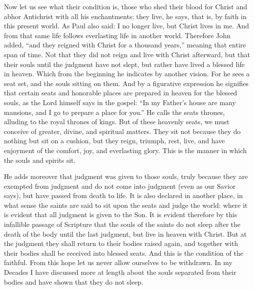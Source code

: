 Now let us see what their condition is, those who shed their blood for Christ and abhor Antichrist with all his enchantments: they live, he says, that is, by faith in this present world. As Paul also said: I no longer live, but Christ lives in me. And from that same life follows everlasting life in another world. Therefore John added, “and they reigned with Christ for a thousand years,” meaning that entire span of time. Not that they did not reign and live with Christ afterward, but that their souls until the judgment have not slept, but rather have lived a blessed life in heaven. Which from the beginning he indicates by another vision. For he sees a seat set, and the souls sitting on them. And by a figurative expression he signifies that certain seats and honorable places are prepared in heaven for the blessed souls, as the Lord himself says in the gospel: “In my Father’s house are many mansions, and I go to prepare a place for you.” He calls the seats thrones, alluding to the royal thrones of kings. But of these heavenly seats, we must conceive of greater, divine, and spiritual matters. They sit not because they do nothing but sit on a cushion, but they reign, triumph, rest, live, and have enjoyment of the comfort, joy, and everlasting glory. This is the manner in which the souls and spirits sit.

He adds moreover that judgment was given to those souls, truly because they are exempted from judgment and do not come into judgment (even as our Savior says), but have passed from death to life. It is also declared in another place, in what sense the saints are said to sit upon the seats and judge the world: where it is evident that all judgment is given to the Son. It is evident therefore by this infallible passage of Scripture that the souls of the saints do not sleep after the death of the body until the last judgment, but live in heaven with Christ. But at the judgment they shall return to their bodies raised again, and together with their bodies shall be received into blessed seats. And this is the condition of the faithful. From this hope let us never allow ourselves to be withdrawn. In my Decades I have discussed more at length about the souls separated from their bodies and have shown that they do not sleep.

